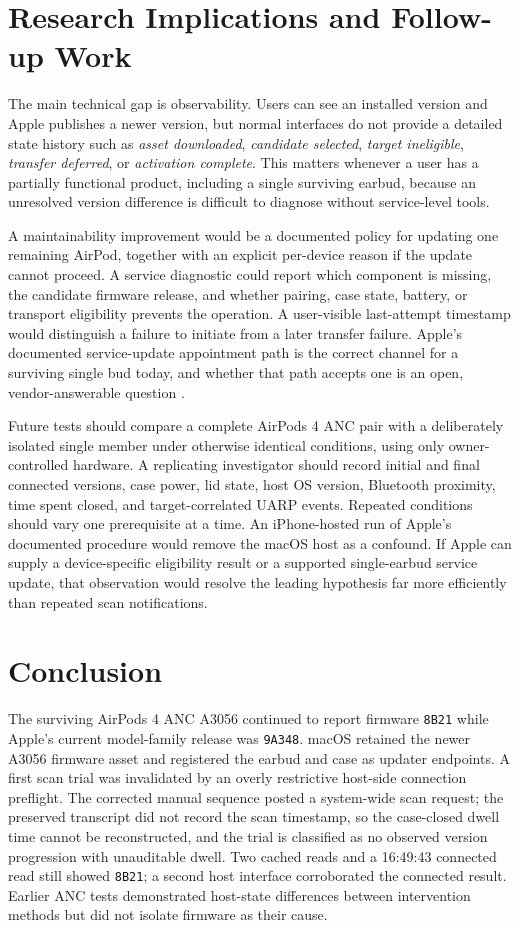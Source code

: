 \documentclass[11pt,letterpaper]{article}
\begin{document}
\section{Research Implications and Follow-up Work}\label{sec:implications}
The main technical gap is observability. Users can see an installed version and Apple publishes a newer version, but normal interfaces do not provide a detailed state history such as \emph{asset downloaded}, \emph{candidate selected}, \emph{target ineligible}, \emph{transfer deferred}, or \emph{activation complete}. This matters whenever a user has a partially functional product, including a single surviving earbud, because an unresolved version difference is difficult to diagnose without service-level tools.

A maintainability improvement would be a documented policy for updating one remaining AirPod, together with an explicit per-device reason if the update cannot proceed. A service diagnostic could report which component is missing, the candidate firmware release, and whether pairing, case state, battery, or transport eligibility prevents the operation. A user-visible last-attempt timestamp would distinguish a failure to initiate from a later transfer failure. Apple's documented service-update appointment path is the correct channel for a surviving single bud today, and whether that path accepts one is an open, vendor-answerable question \cite{applefw,applehelp}.

Future tests should compare a complete AirPods 4 ANC pair with a deliberately isolated single member under otherwise identical conditions, using only owner-controlled hardware. A replicating investigator should record initial and final connected versions, case power, lid state, host OS version, Bluetooth proximity, time spent closed, and target-correlated UARP events. Repeated conditions should vary one prerequisite at a time. An iPhone-hosted run of Apple's documented procedure would remove the macOS host as a confound. If Apple can supply a device-specific eligibility result or a supported single-earbud service update, that observation would resolve the leading hypothesis far more efficiently than repeated scan notifications.

\section{Conclusion}\label{sec:conclusion}
The surviving AirPods 4 ANC A3056 continued to report firmware \texttt{8B21} while Apple's current model-family release was \texttt{9A348}. macOS retained the newer A3056 firmware asset and registered the earbud and case as updater endpoints. A first scan trial was invalidated by an overly restrictive host-side connection preflight. The corrected manual sequence posted a system-wide scan request; the preserved transcript did not record the scan timestamp, so the case-closed dwell time cannot be reconstructed, and the trial is classified as no observed version progression with unauditable dwell. Two cached reads and a 16:49:43 connected read still showed \texttt{8B21}; a second host interface corroborated the connected result. Earlier ANC tests demonstrated host-state differences between intervention methods but did not isolate firmware as their cause.
\end{document}
